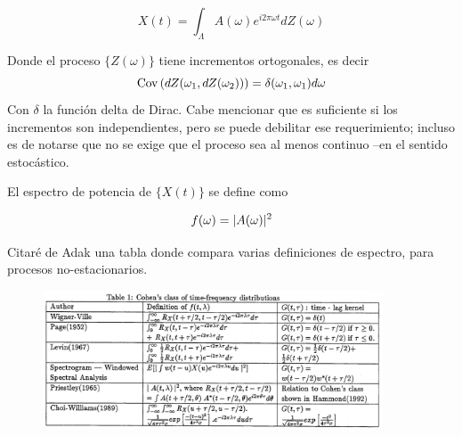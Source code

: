
\begin{equation*}
X(t) = \int_{\Lambda} A(\omega) e^{i 2\pi \omega t} dZ(\omega)
\end{equation*}

Donde el proceso $\{ Z(\omega) \}$ tiene incrementos ortogonales, es decir 
\begin{equation*}
\mathrm{Cov}\left( dZ(\omega_1,dZ(\omega_2)) \right) = \delta(\omega_1,\omega_1) d\omega
\end{equation*}
Con $\delta$ la funci\'on delta de Dirac. Cabe mencionar que es suficiente si los incrementos
son independientes, pero se puede debilitar ese requerimiento; incluso es de notarse que no
se exige que el proceso sea al menos continuo --en el sentido estoc\'astico.

El espectro de potencia de $\{X(t)\}$ se define como

\begin{equation*}
f(\omega) = \lvert A(\omega) \rvert^{2}
\end{equation*}

Citar\'e de Adak \cite{Adak98} una tabla donde compara varias definiciones de espectro, para
procesos no-estacionarios.

\begin{figure}[h]
\centering
\includegraphics[width=0.9\textwidth]{tabla.png} 
\end{figure}

